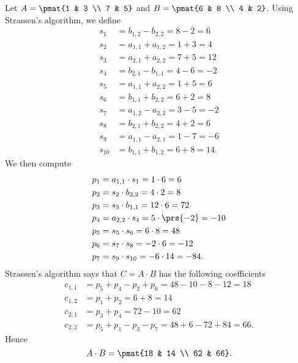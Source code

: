 \documentclass[oneside]{scrbook}
\theoremstyle{definition}
\begin{document}
\begin{exercise}
    Let $A = \pmat{1 & 3 \\ 7 & 5}$ and $B = \pmat{6 & 8 \\ 4 & 2}$.
    Using Strassen's algorithm, we define
    \begin{align*}
        s_1 &= b_{1,2} - b_{2,2} = 8 - 2 = 6 \\
        s_2 &= a_{1,1} + a_{1,2} = 1 + 3 = 4 \\
        s_3 &= a_{2,1} + a_{2,2} = 7 + 5 = 12 \\
        s_4 &= b_{2,1} - b_{1,1} = 4 - 6 = -2 \\
        s_5 &= a_{1,1} +  a_{2,2} = 1 + 5 = 6 \\
        s_6 &= b_{1,1} + b_{2,2} = 6 + 2 = 8 \\
        s_7 &= a_{1,2} - a_{2,2} = 3 - 5 = -2 \\
        s_8 &= b_{2,1} + b_{2,2} = 4 + 2 = 6 \\
        s_9 &= a_{1,1} - a_{2,1} = 1 - 7 = -6 \\
        s_{10} &= b_{1,1} + b_{1,2} = 6 + 8 = 14 \text{.}
    \end{align*}
    We then compute
    \begin{align*}
        p_1 &= a_{1,1} \cdot s_1 = 1 \cdot 6 = 6 \\
        p_2 &= s_2 \cdot b_{2,2} = 4 \cdot 2 = 8 \\
        p_3 &= s_3 \cdot b_{1,1} = 12 \cdot 6 = 72 \\
        p_4 &= a_{2,2} \cdot s_4 = 5 \cdot \prs{-2} = -10 \\
        p_5 &= s_5 \cdot s_6 = 6 \cdot 8 = 48 \\
        p_6 &= s_7 \cdot s_8 = -2 \cdot 6 = -12 \\
        p_7 &= s_9 \cdot s_{10} = -6 \cdot 14 = -84 \text{.}
    \end{align*}
    Strassen's algorithm says that $C = A \cdot B$ has the following coefficients
    \begin{align*}
        c_{1,1} &= p_5 + p_4 - p_2 + p_6 = 48 - 10 - 8 - 12 = 18 \\
        c_{1,2} &= p_1 + p_2 = 6 + 8 = 14 \\
        c_{2,1} &= p_3 + p_4 = 72 - 10 = 62 \\
        c_{2,2} &= p_5 + p_1 - p_3 - p_7 = 48 + 6 - 72 + 84 = 66 \text{.}
    \end{align*}
    Hence
    \[A \cdot B = \pmat{18 & 14 \\ 62 & 66} \text{.}\]
\end{exercise}
\end{document}
